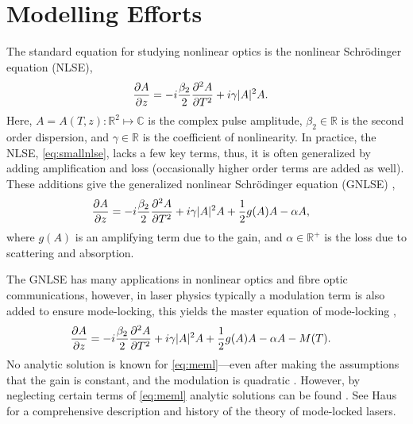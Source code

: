 \documentclass[9pt,twocolumn,twoside]{osajnl}
\newcommand{\pdiff}[3][\hspace{-0.5pt}]{\frac{\partial^{#1}#2}{\partial{#3}^{#1}}} %
\begin{document}
\section{Modelling Efforts}
\label{sec:modelling}
The standard equation for studying nonlinear optics is the nonlinear Schr\"odinger equation (NLSE),
\begin{align}
	\pdiff{A}{z} &= - i \frac{\beta_2}{2}\pdiff[2]{A}{T} + i \gamma |A|^2 A.
	\label{eq:smallnlse}
\end{align}
Here, $A = A(T, z) : \mathbb{R}^2 \mapsto \mathbb{C}$ is the complex pulse amplitude, $\beta_2 \in \mathbb{R}$ is the second order dispersion, and $\gamma \in \mathbb{R}$ is the coefficient of nonlinearity. In practice, the NLSE, \eqref{eq:smallnlse}, lacks a few key terms, thus, it is often generalized by adding amplification and loss (occasionally higher order terms are added as well). These additions give the generalized nonlinear Schr\"{o}dinger equation (GNLSE) \cite{agrawal2013, bohun2015, finot2008, peng2018, shtyrina2017, yarutkina2013},
	\begin{align}
	\pdiff{A}{z} &= - i \frac{\beta_2}{2}\pdiff[2]{A}{T} + i \gamma |A|^2 A + \frac{1}{2}g(A) A - \alpha A,
	\label{eq:nlse}
\end{align}
where $g(A)$ is an amplifying term due to the gain, and $\alpha \in \mathbb{R}^+$ is the loss due to scattering and absorption.

The GNLSE has many applications in nonlinear optics and fibre optic communications, however, in laser physics typically a modulation term is also added to ensure mode-locking, this yields the master equation of mode-locking \cite{haus1984, haus1975, haus1986, haus1992, haus2000, tamura1996, usechak2005},
\begin{align}
	\pdiff{A}{z} &= - i \frac{\beta_2}{2}\pdiff[2]{A}{T} + i \gamma |A|^2 A + \frac{1}{2}g(A) A - \alpha A - M(T).
	\label{eq:meml}
\end{align}
No analytic solution is known for \eqref{eq:meml}---even after making the assumptions that the gain is constant, and the modulation is quadratic \cite{haus1984, haus1975, haus1996}. However, by neglecting certain terms of \eqref{eq:meml} analytic solutions can be found \cite{burgoyne2014, haus1975, haus1986, haus1991, haus1992, haus1996, tamura1996, usechak2005}. See Haus \cite{haus2000} for a comprehensive description and history of the theory of mode-locked lasers.
\end{document}
